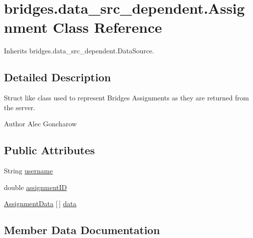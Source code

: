 \hypertarget{classbridges_1_1data__src__dependent_1_1_assignment}{}\section{bridges.\+data\+\_\+src\+\_\+dependent.\+Assignment Class Reference}
\label{classbridges_1_1data__src__dependent_1_1_assignment}


Inherits bridges.\+data\+\_\+src\+\_\+dependent.\+Data\+Source.



\subsection{Detailed Description}
Struct like class used to represent Bridges Assignments as they are returned from the server. 

\begin{DoxyAuthor}{Author}
Alec Goncharow 
\end{DoxyAuthor}
\subsection*{Public Attributes}
\begin{DoxyCompactItemize}
\item 
String \mbox{\hyperlink{classbridges_1_1data__src__dependent_1_1_assignment_aa7326ba8e0eb02fff4e5b22e4b89e61d}{username}}
\item 
double \mbox{\hyperlink{classbridges_1_1data__src__dependent_1_1_assignment_a88c98da9e5ba6f8d83326d6fbae659d8}{assignment\+ID}}
\item 
\mbox{\hyperlink{classbridges_1_1data__src__dependent_1_1_assignment_data}{Assignment\+Data}} \mbox{[}$\,$\mbox{]} \mbox{\hyperlink{classbridges_1_1data__src__dependent_1_1_assignment_a23d503c5e6eae939bb8262dc8e18c259}{data}}
\end{DoxyCompactItemize}


\subsection{Member Data Documentation}
\mbox{\label{classbridges_1_1data__src__dependent_1_1_assignment_a88c98da9e5ba6f8d83326d6fbae659d8}} 
